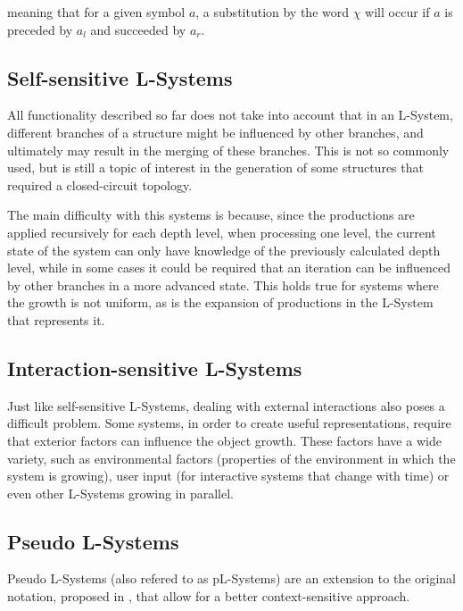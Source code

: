 \documentclass{acmtog}
\begin{document}
meaning that for a given symbol $a$, a substitution by the word $\chi$ will occur if $a$ is preceded by $a_{l}$ and succeeded by $a_{r}$.


\subsection{Self-sensitive L-Systems}
\label{subsec:selfsensitive}

All functionality described so far does not take into account that in an L-System, different branches of a structure might be influenced by other branches, and ultimately may result in the merging of these branches. This is not so commonly used, but is still a topic of interest in the generation of some structures that required a closed-circuit topology.

The main difficulty with this systems is because, since the productions are applied recursively for each depth level, when processing one level, the current state of the system can only have knowledge of the previously calculated depth level, while in some cases it could be required that an iteration can be influenced by other branches in a more advanced state. This holds true for systems where the growth is not uniform, as is the expansion of productions in the L-System that represents it.

\subsection{Interaction-sensitive L-Systems}
\label{subsec:interactionsensitive}

Just like self-sensitive L-Systems, dealing with external interactions also poses a difficult problem. Some systems, in order to create useful representations, require that exterior factors can influence the object growth. These factors have a wide variety, such as environmental factors (properties of the environment in which the system is growing), user input (for interactive systems that change with time) or even other L-Systems growing in parallel.

\subsection{Pseudo L-Systems}

Pseudo L-Systems (also refered to as pL-Systems) are an extension to the original notation, proposed in \cite{prusinkiewicz1985graphical}, that allow for a better context-sensitive approach.
\end{document}
